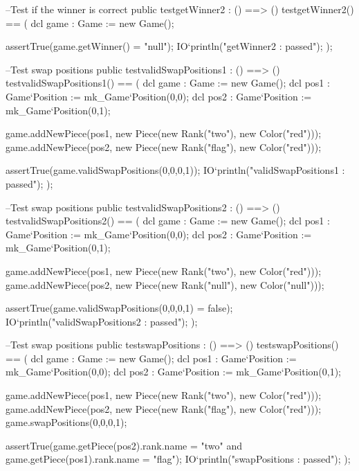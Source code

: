\begin{vdm_al}
  --Test if the winner is correct
  public testgetWinner2 : () ==> ()
   testgetWinner2() ==
   (
    dcl game : Game := new Game();
    
    assertTrue(game.getWinner() = "null");
    IO`println("getWinner2 : passed");
   );
   
  --Test swap positions
  public testvalidSwapPositions1 : () ==> ()
   testvalidSwapPositions1() ==
   (
    dcl game : Game := new Game();
    dcl pos1 : Game`Position := mk_Game`Position(0,0);
    dcl pos2 : Game`Position := mk_Game`Position(0,1);
    
    game.addNewPiece(pos1, new Piece(new Rank("two"), new Color("red")));
    game.addNewPiece(pos2, new Piece(new Rank("flag"), new Color("red")));
    
    assertTrue(game.validSwapPositions(0,0,0,1));
    IO`println("validSwapPositions1 : passed");
   );
   
  --Test swap positions
  public testvalidSwapPositions2 : () ==> ()
   testvalidSwapPositions2() ==
   (
    dcl game : Game := new Game();
    dcl pos1 : Game`Position := mk_Game`Position(0,0);
    dcl pos2 : Game`Position := mk_Game`Position(0,1);
    
    game.addNewPiece(pos1, new Piece(new Rank("two"), new Color("red")));
    game.addNewPiece(pos2, new Piece(new Rank("null"), new Color("null")));
    
    assertTrue(game.validSwapPositions(0,0,0,1) = false);
    IO`println("validSwapPositions2 : passed");
   );
   
  --Test swap positions
  public testswapPositions : () ==> ()
   testswapPositions() ==
   (
    dcl game : Game := new Game();
    dcl pos1 : Game`Position := mk_Game`Position(0,0);
    dcl pos2 : Game`Position := mk_Game`Position(0,1);
    
    game.addNewPiece(pos1, new Piece(new Rank("two"), new Color("red")));
    game.addNewPiece(pos2, new Piece(new Rank("flag"), new Color("red")));
    game.swapPositions(0,0,0,1);
    
    assertTrue(game.getPiece(pos2).rank.name = "two" and game.getPiece(pos1).rank.name = "flag");
    IO`println("swapPositions : passed");
   );
   

\end{vdm_al}
